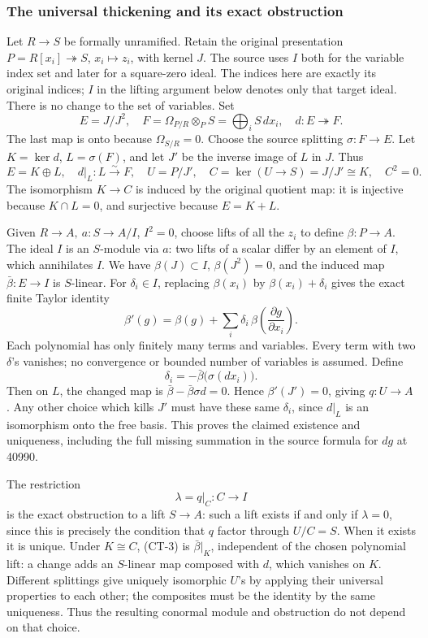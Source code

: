 \subsubsection{The universal thickening and its exact obstruction}\label{algebra-proof-055-the-universal-thickening-and-its-exact-obstruction}

Let \(R\to S\) be formally unramified. Retain the original presentation \(P=R[x_i]\twoheadrightarrow S\), \(x_i\mapsto z_i\), with kernel \(J\). The source uses \(I\) both for the variable index set and later for a square-zero ideal. The indices here are exactly its original indices; \(I\) in the lifting argument below denotes only that target ideal. There is no change to the set of variables. Set \[
E=J/J^2,\quad F=\Omega_{P/R}\otimes_PS=\bigoplus_iS\,dx_i,\quad
d:E\twoheadrightarrow F.
\] The last map is onto because \(\Omega_{S/R}=0\). Choose the source splitting \(\sigma:F\to E\). Let \(K=\ker d\), \(L=\sigma(F)\), and let \(J'\) be the inverse image of \(L\) in \(J\). Thus \[
E=K\oplus L,\quad d|_L:L\xrightarrow{\sim}F,\quad
U=P/J',\quad C=\ker(U\to S)=J/J'\cong K,\quad C^2=0.
\tag{CT-1}
\] The isomorphism \(K\to C\) is induced by the original quotient map: it is injective because \(K\cap L=0\), and surjective because \(E=K+L\).

Given \(R\to A,\ a:S\to A/I\), \(I^2=0\), choose lifts of all the \(z_i\) to define \(\beta:P\to A\). The ideal \(I\) is an \(S\)-module via \(a\): two lifts of a scalar differ by an element of \(I\), which annihilates \(I\). We have \(\beta(J)\subset I\), \(\beta(J^2)=0\), and the induced map \(\bar\beta:E\to I\) is \(S\)-linear. For \(\delta_i\in I\), replacing \(\beta(x_i)\) by \(\beta(x_i)+\delta_i\) gives the exact finite Taylor identity \[
\beta'(g)=\beta(g)+\sum_i\delta_i\,
\beta\!\left(\frac{\partial g}{\partial x_i}\right).
\tag{CT-2}
\] Each polynomial has only finitely many terms and variables. Every term with two \(\delta\)'s vanishes; no convergence or bounded number of variables is assumed. Define \[
\delta_i=-\bar\beta\bigl(\sigma(dx_i)\bigr).
\] Then on \(L\), the changed map is \(\bar\beta-\bar\beta\sigma d=0\). Hence \(\beta'(J')=0\), giving \(q:U\to A\). Any other choice which kills \(J'\) must have these same \(\delta_i\), since \(d|_L\) is an isomorphism onto the free basis. This proves the claimed existence and uniqueness, including the full missing summation in the source formula for \(dg\) at 40990.

The restriction \[
\lambda=q|_C:C\longrightarrow I
\tag{CT-3}
\] is the exact obstruction to a lift \(S\to A\): such a lift exists if and only if \(\lambda=0\), since this is precisely the condition that \(q\) factor through \(U/C=S\). When it exists it is unique. Under \(K\cong C\), (CT-3) is \(\bar\beta|_K\), independent of the chosen polynomial lift: a change adds an \(S\)-linear map composed with \(d\), which vanishes on \(K\). Different splittings give uniquely isomorphic \(U\)'s by applying their universal properties to each other; the composites must be the identity by the same uniqueness. Thus the resulting conormal module and obstruction do not depend on that choice.

